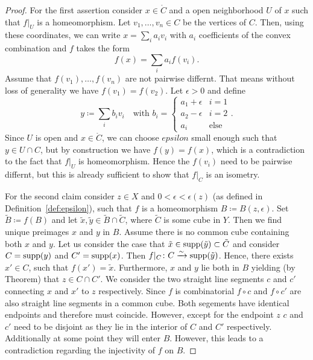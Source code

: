 \begin{proof}
  For the first assertion consider \(x \in \mathring{C}\) and a open neighborhood \(U\) of \(x\) such that \(f|_U\) is a homeomorphism. Let \(v_1, \dots, v_n \in C\) be the vertices of \(C\). Then, using these coordinates, we can write \(x = \sum_i a_i v_i\) with \(a_i\) coefficients of the convex combination and \(f\) takes the form
  \[
    f(x) = \sum_i a_i f(v_i).
  \]
  Assume that \(f(v_1), \dots, f(v_n)\) are not pairwise differnt. That means without loss of generality we have \(f(v_1) = f(v_2)\). Let \(\epsilon > 0\) and define
  \[
    y \coloneqq \sum_i b_i v_i \quad \text{with } b_i = \begin{cases}a_1 + \epsilon & i = 1\\a_2 - \epsilon & i = 2\\ a_i & \text{else}\end{cases}.
  \]
  Since \(U\) is open and \(x \in \mathring{C}\), we can choose \(epsilon\) small enough such that \(y \in U \cap C\), but by construction we have \(f(y) = f(x)\), which is a contradiction to the fact that \(f|_U\) is homeomorphism. Hence the \(f(v_i)\) need to be pairwise differnt, but this is already sufficient to show that \(f|_C\) is an isometry.

  For the second claim consider \(z \in X\) and \(0 < \epsilon < \epsilon(z)\) (as defined in Definition~\ref{def:epsilon}), such that \(f\) is a homeomorphism \(B \coloneqq B(z, \epsilon)\). Set \(\tilde B \coloneqq f(B)\) and let \(\tilde x, \tilde y \in \tilde B \cap \tilde C\), where \(\tilde C\) is some cube in \(Y\). Then we find unique preimages \(x\) and \(y\) in \(B\).
  Assume there is no common cube containing both \(x\) and \(y\).
  Let us consider the case that \(\tilde x \in \operatorname{supp}(\tilde y) \subset \tilde C\) and consider \(C = \operatorname{supp}(y)\) and \(C' = \operatorname{supp}(x)\). Then \(f|_C\colon C \xrightarrow{\sim} \operatorname{supp}(\tilde y)\). Hence, there exists \(x' \in C\), such that \(f(x') = \tilde x\). Furthermore, \(x\) and \(y\) lie both in \(B\) yielding (by Theorem) that \(z \in C \cap C'\). We consider the two straight line segments \(c\) and \(c'\) connecting \(x\) and \(x'\) to \(z\) respectively. Since \(f\) is combinatorial \(f \circ c\) and \(f \circ c'\) are also straight line segments in a common cube. Both segements have identical endpoints and therefore must coincide. However, except for the endpoint \(z\) \(c\) and \(c'\) need to be disjoint as they lie in the interior of \(C\) and \(C'\) respectively. Additionally at some point they will enter \(B\). However, this leads to a contradiction regarding the injectivity of \(f\) on \(B\).


\end{proof}
